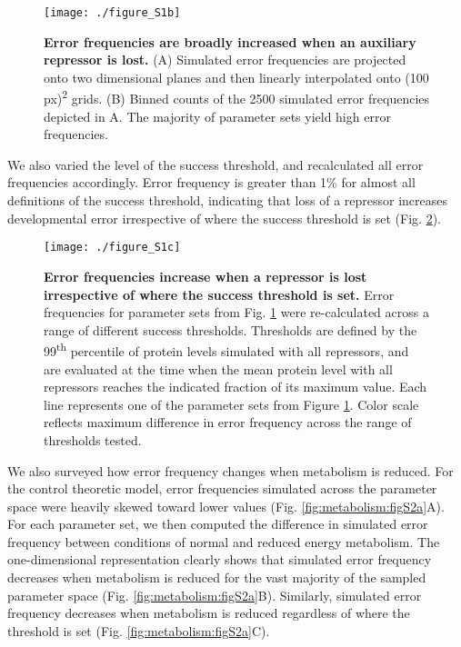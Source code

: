 \begin{figure}[h!]
\centering
\texttt{[image: ./figure\_S1b]}
\caption[Robustness of reduced metabolism simulations to parameter values.]{\textbf{Error frequencies are broadly increased when an auxiliary repressor is lost.} (A) Simulated error frequencies are projected onto two dimensional planes and then linearly interpolated onto (100 px)\textsuperscript{2} grids. (B) Binned counts of the 2500 simulated error frequencies depicted in A. The majority of parameter sets yield high error frequencies.}
\label{fig:metabolism:figS1b}
\end{figure}

We also varied the level of the success threshold, and recalculated all error frequencies accordingly. Error frequency is greater than 1\% for almost all definitions of the success threshold, indicating that loss of a repressor increases developmental error irrespective of where the success threshold is set (Fig. \ref{fig:metabolism:figS1c}).

\begin{figure}[h!]
\centering
\texttt{[image: ./figure\_S1c]}
\caption[Robustness of reduced metabolism simulations to threshold definition.]{\textbf{Error frequencies increase when a repressor is lost irrespective of where the success threshold is set.} Error frequencies for parameter sets from Fig. \ref{fig:metabolism:figS1b} were re-calculated across a range of different success thresholds. Thresholds are defined by the 99\textsuperscript{th} percentile of protein levels simulated with all repressors, and are evaluated at the time when the mean protein level with all repressors reaches the indicated fraction of its maximum value. Each line represents one of the parameter sets from Figure \ref{fig:metabolism:figS1b}. Color scale reflects maximum difference in error frequency across the range of thresholds tested.}
\label{fig:metabolism:figS1c}
\end{figure}

We also surveyed how error frequency changes when metabolism is reduced. For the control theoretic model, error frequencies simulated across the parameter space were heavily skewed toward lower values (Fig. \ref{fig:metabolism:figS2a}A). For each parameter set, we then computed the difference in simulated error frequency between conditions of normal and reduced energy metabolism. The one-dimensional representation clearly shows that simulated error frequency decreases when metabolism is reduced for the vast majority of the sampled parameter space (Fig. \ref{fig:metabolism:figS2a}B). Similarly, simulated error frequency decreases when metabolism is reduced regardless of where the threshold is set (Fig. \ref{fig:metabolism:figS2a}C). 

